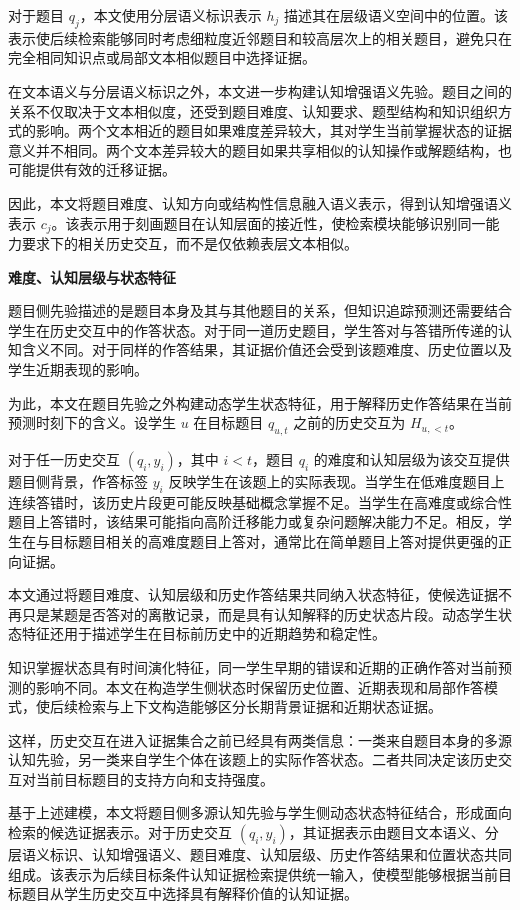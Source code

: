 \documentclass[UTF8,a4paper,12pt]{ctexart}
\numberwithin{table}{section}
\begin{document}
对于题目 \(q_j\)，本文使用分层语义标识表示 \(h_j\) 描述其在层级语义空间中的位置。该表示使后续检索能够同时考虑细粒度近邻题目和较高层次上的相关题目，避免只在完全相同知识点或局部文本相似题目中选择证据。

在文本语义与分层语义标识之外，本文进一步构建认知增强语义先验。题目之间的关系不仅取决于文本相似度，还受到题目难度、认知要求、题型结构和知识组织方式的影响。两个文本相近的题目如果难度差异较大，其对学生当前掌握状态的证据意义并不相同。两个文本差异较大的题目如果共享相似的认知操作或解题结构，也可能提供有效的迁移证据。

因此，本文将题目难度、认知方向或结构性信息融入语义表示，得到认知增强语义表示 \(c_j\)。该表示用于刻画题目在认知层面的接近性，使检索模块能够识别同一能力要求下的相关历史交互，而不是仅依赖表层文本相似。

\noindent\textbf{难度、认知层级与状态特征}

题目侧先验描述的是题目本身及其与其他题目的关系，但知识追踪预测还需要结合学生在历史交互中的作答状态。对于同一道历史题目，学生答对与答错所传递的认知含义不同。对于同样的作答结果，其证据价值还会受到该题难度、历史位置以及学生近期表现的影响。

为此，本文在题目先验之外构建动态学生状态特征，用于解释历史作答结果在当前预测时刻下的含义。设学生 \(u\) 在目标题目 \(q_{u,t}\) 之前的历史交互为 \(H_{u,<t}\)。

对于任一历史交互 \((q_i,y_i)\)，其中 \(i<t\)，题目 \(q_i\) 的难度和认知层级为该交互提供题目侧背景，作答标签 \(y_i\) 反映学生在该题上的实际表现。当学生在低难度题目上连续答错时，该历史片段更可能反映基础概念掌握不足。当学生在高难度或综合性题目上答错时，该结果可能指向高阶迁移能力或复杂问题解决能力不足。相反，学生在与目标题目相关的高难度题目上答对，通常比在简单题目上答对提供更强的正向证据。

本文通过将题目难度、认知层级和历史作答结果共同纳入状态特征，使候选证据不再只是某题是否答对的离散记录，而是具有认知解释的历史状态片段。动态学生状态特征还用于描述学生在目标前历史中的近期趋势和稳定性。

知识掌握状态具有时间演化特征，同一学生早期的错误和近期的正确作答对当前预测的影响不同。本文在构造学生侧状态时保留历史位置、近期表现和局部作答模式，使后续检索与上下文构造能够区分长期背景证据和近期状态证据。

这样，历史交互在进入证据集合之前已经具有两类信息：一类来自题目本身的多源认知先验，另一类来自学生个体在该题上的实际作答状态。二者共同决定该历史交互对当前目标题目的支持方向和支持强度。

基于上述建模，本文将题目侧多源认知先验与学生侧动态状态特征结合，形成面向检索的候选证据表示。对于历史交互 \((q_i,y_i)\)，其证据表示由题目文本语义、分层语义标识、认知增强语义、题目难度、认知层级、历史作答结果和位置状态共同组成。该表示为后续目标条件认知证据检索提供统一输入，使模型能够根据当前目标题目从学生历史交互中选择具有解释价值的认知证据。
\end{document}
